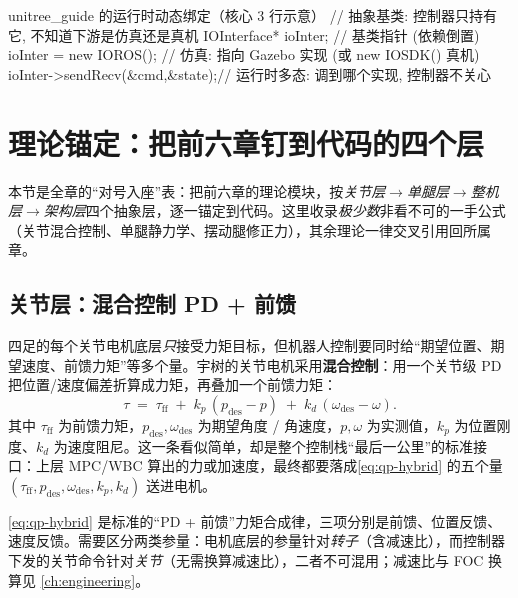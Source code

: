 \begin{codebox}[C++]{unitree\_guide 的运行时动态绑定（核心 3 行示意）}
// 抽象基类: 控制器只持有它, 不知道下游是仿真还是真机
IOInterface* ioInter;          // 基类指针 (依赖倒置)
ioInter = new IOROS();         // 仿真: 指向 Gazebo 实现 (或 new IOSDK() 真机)
ioInter->sendRecv(&cmd,&state);// 运行时多态: 调到哪个实现, 控制器不关心
\end{codebox}

\section{理论锚定：把前六章钉到代码的四个层}
\label{sec:qp-anchor}

本节是全章的“对号入座”表：把前六章的理论模块，按\emph{关节层$\to$单腿层$\to$整机层$\to$架构层}四个抽象层，逐一锚定到代码。这里收录\emph{极少数}非看不可的一手公式（关节混合控制、单腿静力学、摆动腿修正力），其余理论一律交叉引用回所属章。

\subsection{关节层：混合控制 PD + 前馈}
\label{subsec:qp-joint}

四足的每个关节电机底层\emph{只}接受力矩目标，但机器人控制要同时给“期望位置、期望速度、前馈力矩”等多个量。宇树的关节电机采用\textbf{混合控制}：用一个关节级 PD 把位置/速度偏差折算成力矩，再叠加一个前馈力矩\cite{unitree2023quadruped}：
\begin{equation}
  \tau \;=\; \tau_{\mathrm{ff}} \;+\; k_p\,(p_{\mathrm{des}}-p) \;+\; k_d\,(\omega_{\mathrm{des}}-\omega).
  \label{eq:qp-hybrid}
\end{equation}
其中 $\tau_{\mathrm{ff}}$ 为前馈力矩，$p_{\mathrm{des}},\omega_{\mathrm{des}}$ 为期望角度 / 角速度，$p,\omega$ 为实测值，$k_p$ 为位置刚度、$k_d$ 为速度阻尼。这一条看似简单，却是整个控制栈“最后一公里”的标准接口：上层 MPC/WBC 算出的力或加速度，最终都要落成\cref{eq:qp-hybrid} 的五个量 $(\tau_{\mathrm{ff}},p_{\mathrm{des}},\omega_{\mathrm{des}},k_p,k_d)$ 送进电机\cite{unitree2023quadruped}。

\begin{note}[转子参量与关节命令勿混]
\cref{eq:qp-hybrid} 是标准的“PD + 前馈”力矩合成律，三项分别是前馈、位置反馈、速度反馈。需要区分两类参量：电机底层的参量针对\emph{转子}（含减速比），而控制器下发的关节命令针对\emph{关节}（无需换算减速比），二者不可混用；减速比与 FOC 换算见 \cref{ch:engineering}。
\end{note}

